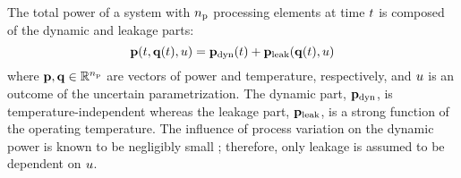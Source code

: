 The total power of a system with ${n_\text{p}}$ processing elements at time $t$ is composed of the dynamic and leakage parts:
\begin{equation} \elabel{total-power}
  \vP(\t, \vT(\t), \u) = \vP_\dyn(\t) + \vP_\leak(\vT(\t), \u)
\end{equation}
where $\mathbf{p}, \mathbf{q} \in \mathbb{R}^{n_\text{p}}$ are vectors of power and temperature, respectively, and $u$ is an outcome of the uncertain parametrization. The dynamic part, $\mathbf{p}_{\text{dyn}}$, is temperature-independent whereas the leakage part, $\mathbf{p}_{\text{leak}}$, is a strong function of the operating temperature. The influence of process variation on the dynamic power is known to be negligibly small \cite{srivastava2010}; therefore, only leakage is assumed to be dependent on $u$.
